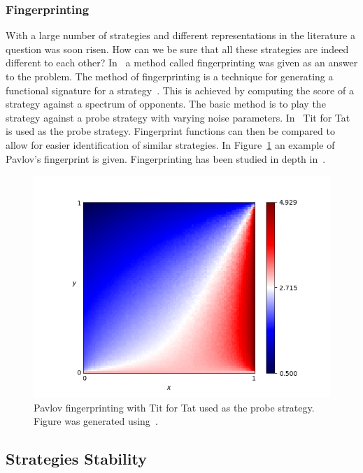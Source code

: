 \documentclass{article}
\begin{document}
\subsubsection{Fingerprinting}

With a large number of strategies and different representations in the literature
a question was soon risen. How can we be sure that all these strategies are 
indeed different to each other? In~\cite{Ashlock2005} a method called 
fingerprinting was given as an answer to the problem. The method of 
fingerprinting is a technique for generating a functional signature for a 
strategy~\cite{Ashlock2008}. This is achieved by computing the score of a strategy
against a spectrum of opponents. The basic method is to play the strategy
against a probe strategy with varying noise parameters. In~\cite{Ashlock2005} 
Tit for Tat is used as the probe strategy. Fingerprint functions
can then be compared to allow for easier identification of similar strategies.
In Figure~\ref{fig:fingerprinting} an example of Pavlov's fingerprint is given.
Fingerprinting has been studied in depth in~\cite{Ashlock2008, Ashlock2009, 
Ashlock2010, Ashlock2006a}.

\begin{figure}[!hbtp]
    \centering
    \includegraphics[height=.3\textheight]{./assets/images/Win-Stay_Lose-Shift.png}
    \caption{Pavlov fingerprinting with Tit for Tat used as the probe strategy.
    Figure was generated using~\cite{axelrodproject}.}
    \label{fig:fingerprinting}
\end{figure}

\subsection{Strategies Stability}
\end{document}
